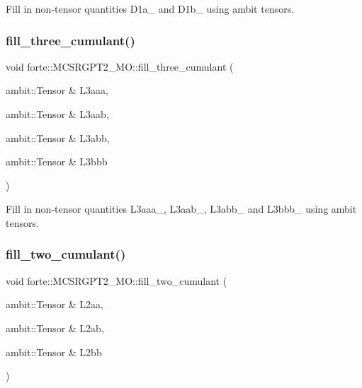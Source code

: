 Fill in non-\/tensor quantities D1a\+\_\+ and D1b\+\_\+ using ambit tensors. 

\mbox{\label{classforte_1_1_m_c_s_r_g_p_t2___m_o_ada5a88df27b0c810a6da3188fe3bfe0b}} 
\subsubsection{\texorpdfstring{fill\+\_\+three\+\_\+cumulant()}{fill\_three\_cumulant()}}
{\footnotesize\ttfamily void forte\+::\+M\+C\+S\+R\+G\+P\+T2\+\_\+\+M\+O\+::fill\+\_\+three\+\_\+cumulant (\begin{DoxyParamCaption}\item[{ambit\+::\+Tensor \&}]{L3aaa,  }\item[{ambit\+::\+Tensor \&}]{L3aab,  }\item[{ambit\+::\+Tensor \&}]{L3abb,  }\item[{ambit\+::\+Tensor \&}]{L3bbb }\end{DoxyParamCaption})\hspace{0.3cm}{\ttfamily [protected]}}



Fill in non-\/tensor quantities L3aaa\+\_\+, L3aab\+\_\+, L3abb\+\_\+ and L3bbb\+\_\+ using ambit tensors. 

\mbox{\label{classforte_1_1_m_c_s_r_g_p_t2___m_o_a16a2294f9dda61114a38f0652144fa7d}} 
\subsubsection{\texorpdfstring{fill\+\_\+two\+\_\+cumulant()}{fill\_two\_cumulant()}}
{\footnotesize\ttfamily void forte\+::\+M\+C\+S\+R\+G\+P\+T2\+\_\+\+M\+O\+::fill\+\_\+two\+\_\+cumulant (\begin{DoxyParamCaption}\item[{ambit\+::\+Tensor \&}]{L2aa,  }\item[{ambit\+::\+Tensor \&}]{L2ab,  }\item[{ambit\+::\+Tensor \&}]{L2bb }\end{DoxyParamCaption})\hspace{0.3cm}{\ttfamily [protected]}}



